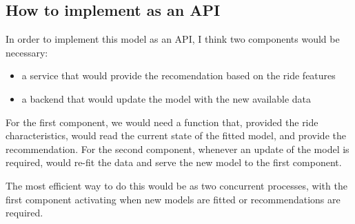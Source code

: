 \documentclass[11pt]{article}
\begin{document}
\subsection{How to implement as an API}
\label{sec:org8f3237a}
In order to implement this model as an API, I think two components would
be necessary:
\begin{itemize}
\item a service that would provide the recomendation based on the ride features
\item a backend that would update the model with the new available data
\end{itemize}

For the first component, we would need a function that, provided the
ride characteristics, would read the current state of the fitted model, and
provide the recommendation.
For the second component, whenever an update of the model is required, would
re-fit the data and serve the new model to the first component.

The most efficient way to do this would be as two concurrent processes, with
the first component activating when new models are fitted or recommendations
are required.
\end{document}
